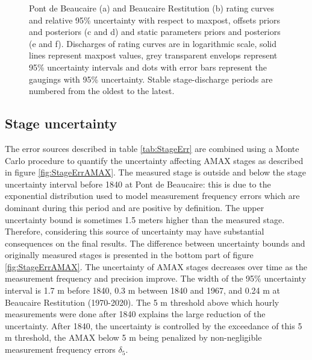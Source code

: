 \documentclass[11pt]{article}
\begin{document}
\begin{figure}[h!]
\begin{subfigure}{0.1\textwidth}
        \end{subfigure}
        \caption{Pont de Beaucaire (a) and Beaucaire Restitution (b) rating curves and relative 95\% uncertainty with respect to maxpost, offsets priors and posteriors (c and d) and static parameters priors and posteriors (e and f). Discharges of rating curves are in logarithmic scale, solid lines represent maxpost values, grey transparent envelops represent 95\% uncertainty intervals and dots with error bars represent the gaugings with 95\% uncertainty. Stable stage-discharge periods are numbered from the oldest to the latest.}
        \label{fig:RcsAndParams}
    \end{figure}
    \FloatBarrier
    
    \subsection{Stage uncertainty}
    \label{subsec:StageErrResults}
    
    The error sources described in table \ref{tab:StageErr} are combined using a Monte Carlo procedure to quantify the uncertainty affecting AMAX stages as described in figure \ref{fig:StageErrAMAX}. The measured stage is outside and below the stage uncertainty interval before 1840 at Pont de Beaucaire: this is due to the exponential distribution used to model measurement frequency errors which are dominant during this period and are positive by definition. The upper uncertainty bound is sometimes 1.5 meters higher than the measured stage. Therefore, considering this source of uncertainty may have substantial consequences on the final results. The difference between uncertainty bounds and originally measured stages is presented in the bottom part of figure \ref{fig:StageErrAMAX}. The uncertainty of AMAX stages decreases over time as the measurement frequency and precision improve. The width of the 95\% uncertainty interval is 1.7 m before 1840, 0.3 m between 1840 and 1967, and 0.24 m at Beaucaire Restitution (1970-2020). The 5 m threshold above which hourly measurements were done after 1840 explains the large reduction of the uncertainty. After 1840, the uncertainty is controlled by the exceedance of this 5 m threshold, the AMAX below 5 m being penalized by non-negligible measurement frequency errors $\delta_5$. 
    
\end{document}
